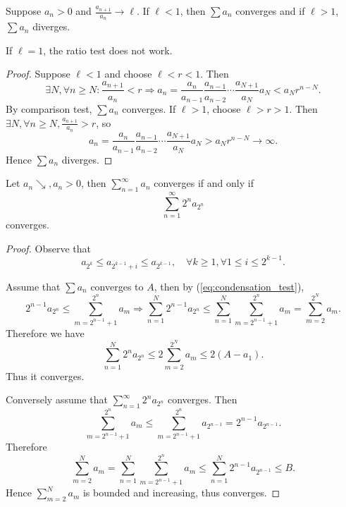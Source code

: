 \begin{theorem}\label{thm:Ratio test}
    Suppose $a_n>0$ and $ \frac{a_{n+1}}{a_n}\to \ell $. If $ \ell <1 $, then $ \sum a_n $ converges and if $ \ell >1 $, $ \sum a_n $ diverges.
\end{theorem}
\begin{note}
    If $\ell=1$, the ratio test does not work.
\end{note}
\begin{proof}
    Suppose $\ell<1$ and choose $\ell<r<1$. Then
    \[
        \exists N, \forall n\ge N: \frac{a_{n+1}}{a_n}<r \Longrightarrow a_n = \frac{a_n}{a_{n-1}}\frac{a_{n-1}}{a_{n-2}}\cdots \frac{a_{N+1}}{a_{N}}a_N<a_N r^{n-N} .
    \]
    By comparison test, $ \sum a_n $ converges. If $ \ell >1 $, choose $\ell>r>1$. Then $ \exists N, \forall n\ge N, \frac{a_{n+1}}{a_n}>r $, so 
    \[
        a_n = \frac{a_n}{a_{n-1}}\frac{a_{n-1}}{a_{n-2}}\cdots \frac{a_{N+1}}{a_{N}}a_N>a_N r^{n-N}\to \infty.
    \]
    Hence $ \sum a_n $ diverges.
\end{proof}

\begin{theorem}\label{thm:Cauchy's condensation test}
    Let $ a_n \searrow, a_n>0 $, then $ \sum_{n=1}^{\infty}a_n $ converges if and only if 
    \[
        \sum_{n=1}^{\infty}2^n a_{2^n}
    \]
    converges.
\end{theorem}
\begin{proof}
    Observe that 
    \begin{equation}\label{eq:condensation_test}\tag{$ * $}
        a_{2^k}\le a_{2^{k-1}+i}\le a_{2^{k-1}},\quad \forall k\ge 1, \forall 1\le i\le 2^{k-1}.
    \end{equation}

    Assume that $ \sum a_n $ converges to $A$, then by (\ref{eq:condensation_test}),
    \[
        2^{n-1}a_{2^n}\le \sum_{m=2^{n-1}+1}^{2^n}a_m \Longrightarrow \sum_{n=1}^{N}2^{n-1}a_{2^n}\le \sum_{n=1}^{N}\sum_{m=2^{n-1}+1}^{2^n}a_m = \sum_{m=2}^{2^N}a_m.
    \]
    Therefore we have 
    \[
        \sum_{n=1}^{N}2^n a_{2^n} \le 2 \sum_{m=2}^{2^N}a_m\le 2(A-a_1).
    \]
    Thus it converges.

    Conversely assume that $ \sum_{n=1}^{\infty}2^na_{2^n} $ converges. Then 
    \[
        \sum_{m=2^{n-1}+1}^{2^n}a_m\le \sum_{m=2^{n-1}+1}^{2^n}a_{2^{n-1}} = 2^{n-1}a_{2^{n-1}}.
    \]
    Therefore 
    \[
        \sum_{m=2}^{N}a_m = \sum_{n=1}^{N}\sum_{m=2^{n-1}+1}^{2^n} a_m \le \sum_{n=1}^{N}2^{n-1}a_{2^{n-1}}\le B.
    \]
    Hence $ \sum_{m=2}^{N}a_m $ is bounded and increasing, thus converges.
\end{proof}

